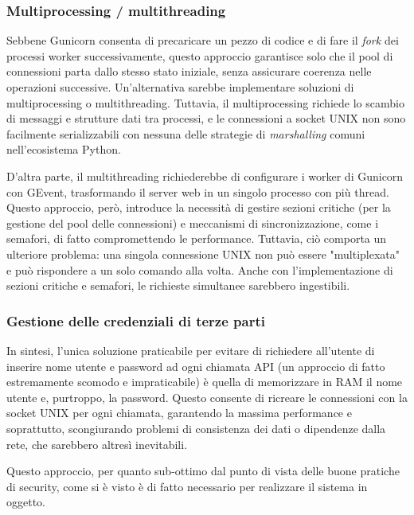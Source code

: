 \subsubsection{Multiprocessing / multithreading}
Sebbene Gunicorn consenta di precaricare un pezzo di codice e di fare il \emph{fork} dei processi worker successivamente, questo approccio garantisce solo che il pool di connessioni parta dallo stesso stato iniziale, senza assicurare coerenza nelle operazioni successive. Un'alternativa sarebbe implementare soluzioni di multiprocessing o multithreading. Tuttavia, il multiprocessing richiede lo scambio di messaggi e strutture dati tra processi, e le connessioni a socket UNIX non sono facilmente serializzabili con nessuna delle strategie di \emph{marshalling} comuni nell'ecosistema Python.

D'altra parte, il multithreading richiederebbe di configurare i worker di Gunicorn con GEvent, trasformando il server web in un singolo processo con più thread. Questo approccio, però, introduce la necessità di gestire sezioni critiche (per la gestione del pool delle connessioni) e meccanismi di sincronizzazione, come i semafori, di fatto compromettendo le performance. Tuttavia, ciò comporta un ulteriore problema: una singola connessione UNIX non può essere "multiplexata" e può rispondere a un solo comando alla volta. Anche con l'implementazione di sezioni critiche e semafori, le richieste simultanee sarebbero ingestibili.

\subsubsection{Gestione delle credenziali di terze parti}
In sintesi, l'unica soluzione praticabile per evitare di richiedere all'utente di inserire nome utente e password ad ogni chiamata API (un approccio di fatto estremamente scomodo e impraticabile) è quella di memorizzare in RAM il nome utente e, purtroppo, la password. Questo consente di ricreare le connessioni con la socket UNIX per ogni chiamata, garantendo la massima performance e soprattutto, scongiurando problemi di consistenza dei dati o dipendenze dalla rete, che sarebbero altresì inevitabili.

Questo approccio, per quanto sub-ottimo dal punto di vista delle buone pratiche di security, come si è visto è di fatto necessario per realizzare il sistema in oggetto.

